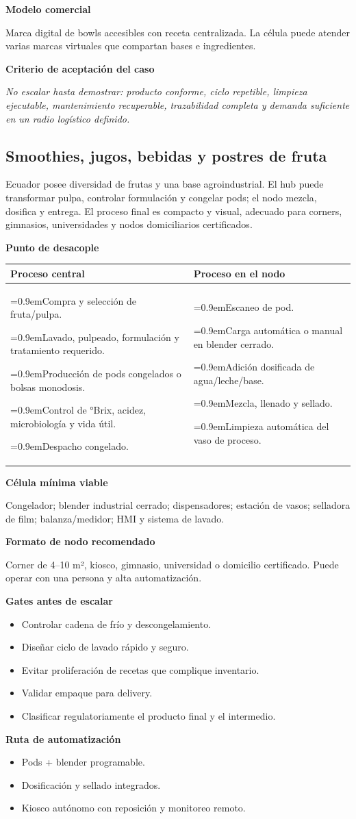 \documentclass[11pt,a4paper]{article}
\makeatletter
\newcommand{\etiqueta}[1]{\par\medskip\noindent\textbf{#1}\par\nopagebreak\smallskip}
\newcommand{\ti}{\par\hangindent=0.9em\hangafter=1\noindent\makebox[0.9em][l]{\textbullet}}
\newcommand{\desacople}[2]{\etiqueta{Punto de desacople}
  {\small\noindent\begin{tabularx}{\textwidth}{@{}>{\raggedright\arraybackslash}X>{\raggedright\arraybackslash}X@{}}
  \toprule \textbf{Proceso central} & \textbf{Proceso en el nodo}\\ \midrule
  #1 & #2\\ \bottomrule\end{tabularx}}\par}
\newcommand{\rutas}[3]{\etiqueta{Ruta de automatización}
  \begin{itemize}[leftmargin=2.6em,labelwidth=2em]
  \item[\textbf{1.0}] #1
  \item[\textbf{2.0}] #2
  \item[\textbf{3.0}] #3
  \end{itemize}}
\newcommand{\criterio}{\etiqueta{Criterio de aceptación del caso}
  \noindent\textit{No escalar hasta demostrar: producto conforme, ciclo repetible, limpieza ejecutable,
  mantenimiento recuperable, trazabilidad completa y demanda suficiente en un radio logístico definido.}\par}
\makeatother
\begin{document}
\etiqueta{Modelo comercial}
Marca digital de bowls accesibles con receta centralizada. La célula puede atender varias marcas
virtuales que compartan bases e ingredientes.

\criterio

\subsection{Smoothies, jugos, bebidas y postres de fruta}
Ecuador posee diversidad de frutas y una base agroindustrial. El hub puede transformar pulpa, controlar
formulación y congelar pods; el nodo mezcla, dosifica y entrega. El proceso final es compacto y visual,
adecuado para corners, gimnasios, universidades y nodos domiciliarios certificados.

\desacople{%
\ti Compra y selección de fruta/pulpa.
\ti Lavado, pulpeado, formulación y tratamiento requerido.
\ti Producción de pods congelados o bolsas monodosis.
\ti Control de °Brix, acidez, microbiología y vida útil.
\ti Despacho congelado.}{%
\ti Escaneo de pod.
\ti Carga automática o manual en blender cerrado.
\ti Adición dosificada de agua/leche/base.
\ti Mezcla, llenado y sellado.
\ti Limpieza automática del vaso de proceso.}

\etiqueta{Célula mínima viable}
Congelador; blender industrial cerrado; dispensadores; estación de vasos; selladora de film;
balanza/medidor; HMI y sistema de lavado.

\etiqueta{Formato de nodo recomendado}
Corner de 4--10 m², kiosco, gimnasio, universidad o domicilio certificado. Puede operar con una persona y
alta automatización.

\etiqueta{Gates antes de escalar}
\begin{itemize}
\item Controlar cadena de frío y descongelamiento.
\item Diseñar ciclo de lavado rápido y seguro.
\item Evitar proliferación de recetas que complique inventario.
\item Validar empaque para delivery.
\item Clasificar regulatoriamente el producto final y el intermedio.
\end{itemize}

\rutas{Pods + blender programable.}
{Dosificación y sellado integrados.}
{Kiosco autónomo con reposición y monitoreo remoto.}
\end{document}
